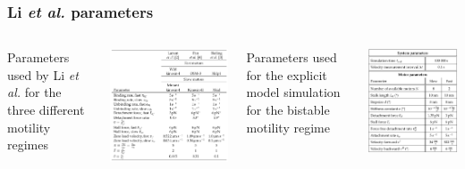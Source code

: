 \documentclass[11pt]{beamer}
\begin{document}
\begin{frame}
 \frametitle{Li \textit{et al.} parameters}
   \begin{columns}
	\begin{footnotesize}Parameters used by Li \textit{et al.} for the three different motility regimes\end{footnotesize}
	\includegraphics[scale=.4]{img/params-exp.png}
	\begin{footnotesize}Parameters used for the explicit model simulation for the bistable motility regime\end{footnotesize}
	\includegraphics[scale=.4]{img/params-sim.png}
    \end{columns} 
\end{frame}
\end{document}
